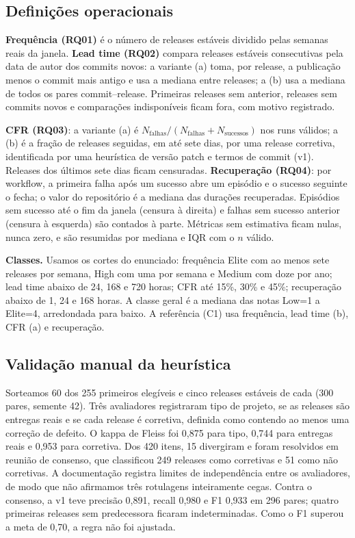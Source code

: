 \subsection{Definições operacionais}
\textbf{Frequência (RQ01)} é o número de releases estáveis dividido pelas
semanas reais da janela. \textbf{Lead time (RQ02)} compara releases estáveis
consecutivas pela data de autor dos commits novos: a variante (a) toma, por
release, a publicação menos o commit mais antigo e usa a mediana entre
releases; a (b) usa a mediana de todos os pares commit--release. Primeiras
releases sem anterior, releases sem commits novos e comparações indisponíveis
ficam fora, com motivo registrado.

\textbf{CFR (RQ03)}: a variante (a) é $N_{\mathrm{falhas}}/(N_{\mathrm{falhas}}
+N_{\mathrm{sucessos}})$ nos runs válidos; a (b) é a fração de releases seguidas,
em até sete dias, por uma release corretiva, identificada por uma heurística de
versão patch e termos de commit (v1). Releases dos últimos sete dias ficam
censuradas. \textbf{Recuperação (RQ04)}: por workflow, a primeira falha após
um sucesso abre um episódio e o sucesso seguinte o fecha; o valor do
repositório é a mediana das durações recuperadas. Episódios sem sucesso até o
fim da janela (censura à direita) e falhas sem sucesso anterior (censura à
esquerda) são contados à parte. Métricas sem estimativa ficam nulas, nunca
zero, e são resumidas por mediana e IQR com o $n$ válido.

\textbf{Classes.} Usamos os cortes do enunciado: frequência Elite com ao menos
sete releases por semana, High com uma por semana e Medium com doze por ano;
lead time abaixo de 24, 168 e 720 horas; CFR até 15\%, 30\% e 45\%;
recuperação abaixo de 1, 24 e 168 horas. A classe geral é a mediana das notas
Low=1 a Elite=4, arredondada para baixo. A referência (C1) usa frequência,
lead time (b), CFR (a) e recuperação.

\subsection{Validação manual da heurística}
\label{sec:validacao-manual}
Sorteamos 60 dos 255 primeiros elegíveis e cinco releases estáveis de cada
(300 pares, semente 42). Três avaliadores registraram tipo de projeto, se as
releases são entregas reais e se cada release é corretiva, definida como
contendo ao menos uma correção de defeito. O kappa de Fleiss
\cite{fleiss1971, statsmodelsFleiss} foi 0,875 para tipo, 0,744 para entregas
reais e 0,953 para corretiva. Dos 420 itens, 15 divergiram e foram resolvidos
em reunião de consenso, que classificou 249 releases como corretivas e 51 como
não corretivas. A documentação registra limites de independência entre os
avaliadores, de modo que não afirmamos três rotulagens inteiramente cegas.
Contra o consenso, a v1 teve precisão 0,891, recall 0,980 e F1 0,933
\cite{sklearnPrecisionRecall} em 296 pares; quatro primeiras releases sem
predecessora ficaram indeterminadas. Como o F1 superou a meta de 0,70, a regra
não foi ajustada.

